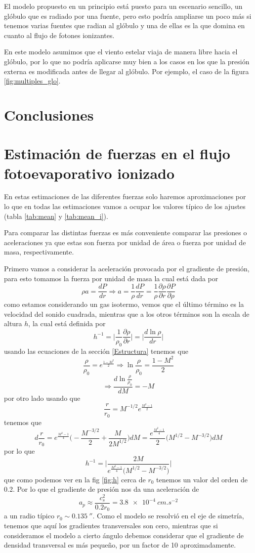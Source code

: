 \documentclass{book}
\begin{document}
El modelo propuesto en un principio está puesto para un escenario sencillo, un glóbulo que es radiado por una fuente, pero esto podría ampliarse un poco más si tenemos varias fuentes que radian al glóbulo y una de ellas es la que domina en cuanto al flujo de fotones ionizantes. 

En este modelo asumimos que el viento estelar viaja de manera libre hacia el glóbulo, por lo que no podría aplicarse muy bien a los casos en los que la presión externa es modificada antes de llegar al glóbulo. Por ejemplo, el caso de la figura \ref{fig:multiples_glo}.


\chapter{Conclusiones}



\appendix
\chapter{Estimación de fuerzas en el flujo fotoevaporativo ionizado} \label{App:fuerzas}

En estas estimaciones de las diferentes fuerzas solo haremos aproximaciones por lo que en todas las estimaciones vamos a ocupar los valores típico de los ajustes (tabla \ref{tab:mean} y \ref{tab:mean_i}).

Para comparar las distintas fuerzas es más conveniente comparar las presiones o aceleraciones ya que estas son fuerza por unidad de área o fuerza por unidad de masa, respectivamente. 


Primero vamos a considerar la aceleración provocada por el gradiente de presión, para esto tomamos la fuerza por unidad de masa la cual está dada por \[\rho a = \frac{dP}{dr}\Rightarrow a= \frac{1}{\rho}\frac{dP}{dr}=\frac{1}{\rho}\frac{\partial \rho}{\partial r}\frac{\partial P}{\partial\rho}\] como estamos considerando un gas isotermo, vemos que el último término es la velocidad del sonido cuadrada, mientras que a los otros términos son la escala de altura $h$, la cual está definida por  \[h^{-1}=\Big|\frac{1}{\rho_0}\frac{\partial\rho}{\partial r}\Big|=\Big|\frac{d \ln \rho}{dr}\Big|\]
usando las ecuaciones de la sección \ref{Estructura} tenemos que \[\frac{\rho}{\rho_0}=e^{\frac{1-M^2}{2}}\Rightarrow\ln\frac{\rho}{\rho_0}=\frac{1-M^2}{2}\]\[\Rightarrow\frac{d\ln\frac{\rho}{\rho_0}}{dM}=-M\] por otro lado usando que \[\frac{r}{r_0}=M^{-1/2}e^{\frac{M^2-1}{2}}\] tenemos que \[d\frac{r}{r_0}=e^{\frac{M^2-1}{4}}\Big(-\frac{M^{-3/2}}{2}+\frac{M}{2M^{1/2}}\Big)dM = \frac{e^{\frac{M^2-1}{4}}}{2}\Big(M^{1/2}-M^{-3/2}\Big)dM\] por lo que \[h^{-1}=\Big|\frac{2M}{e^{\frac{M^2-1}{4}}\Big(M^{1/2}-M^{-3/2}\Big)}\Big|\] que como podemos ver en la fig \ref{fig:h} cerca de $r_0$ tenemos un valor del orden de 0.2. Por lo que el gradiente de presión nos da una aceleración de \[a_p \approx \frac{c_s^2}{0.2 r_0} = \SI{3.8e-4}{cm.s^{-2}}\] a un radio típico $r_0\sim \SI{0.135}{\arcsecond}$. Como el modelo se resolvió en el eje de simetría, tenemos que aquí los gradientes transversales son cero, mientras que si consideramos el modelo a cierto ángulo debemos considerar que el gradiente de densidad transversal es más pequeño, por un factor de 10 aproximadamente. 
\end{document}
